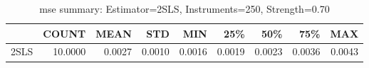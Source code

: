\begin{table}[ht]
\centering
\caption{mse summary: Estimator=2SLS, Instruments=250, Strength=0.70}
\begin{tabular}{lrrrrrrrr}
\toprule
 & COUNT & MEAN & STD & MIN & 25\% & 50\% & 75\% & MAX \\
\midrule
2SLS & 10.0000 & 0.0027 & 0.0010 & 0.0016 & 0.0019 & 0.0023 & 0.0036 & 0.0043 \\
\bottomrule
\end{tabular}
\end{table}
